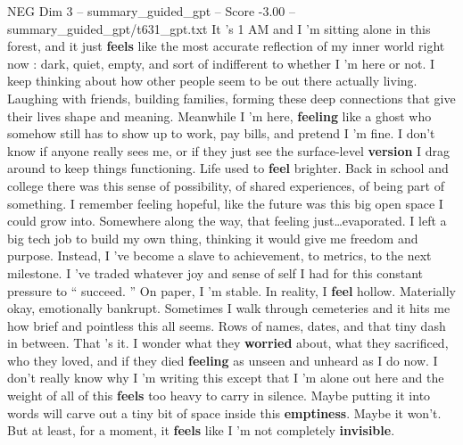 \begin{textsample}{NEG Dim 3 – summary\_guided\_gpt – Score -3.00 – summary\_guided\_gpt/t631\_gpt.txt}  \label{ex:f3_neg_029}
It ’s 1 AM and I ’m sitting alone in this forest, and it just \textbf{feels} like the most accurate reflection of my inner world right now : dark, quiet, empty, and sort of indifferent to whether I ’m here or not.
I keep thinking about how other people seem to be out there actually living.
Laughing with friends, building families, forming these deep connections that give their lives shape and meaning.
Meanwhile I ’m here, \textbf{feeling} like a ghost who somehow still has to show up to work, pay bills, and pretend I ’m fine.
I don't know if anyone really sees me, or if they just see the surface-level \textbf{version} I drag around to keep things functioning.
Life used to \textbf{feel} brighter.
Back in school and college there was this sense of possibility, of shared experiences, of being part of something.
I remember feeling hopeful, like the future was this big open space I could grow into.
Somewhere along the way, that feeling just…evaporated.
I left a big tech job to build my own thing, thinking it would give me freedom and purpose.
Instead, I ’ve become a slave to achievement, to metrics, to the next milestone.
I ’ve traded whatever joy and sense of self I had for this constant pressure to “ succeed. ” On paper, I ’m stable.
In reality, I \textbf{feel} hollow.
Materially okay, emotionally bankrupt.
Sometimes I walk through cemeteries and it hits me how brief and pointless this all seems.
Rows of names, dates, and that tiny dash in between.
That ’s it.
I wonder what they \textbf{worried} about, what they sacrificed, who they loved, and if they died \textbf{feeling} as unseen and unheard as I do now.
I don't really know why I ’m writing this except that I ’m alone out here and the weight of all of this \textbf{feels} too heavy to carry in silence.
Maybe putting it into words will carve out a tiny bit of space inside this \textbf{emptiness}.
Maybe it won't.
But at least, for a moment, it \textbf{feels} like I ’m not completely \textbf{invisible}.

\end{textsample}
